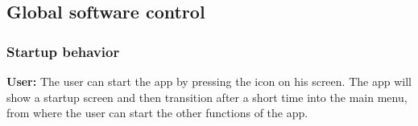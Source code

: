 

\subsection{Global software control}
\subsubsection{Startup behavior}
\textbf{User:} The user can start the app by pressing the icon on his screen.
The app will show a startup screen and then transition after a short time into the main menu, from where the user can start the other functions of the app.

